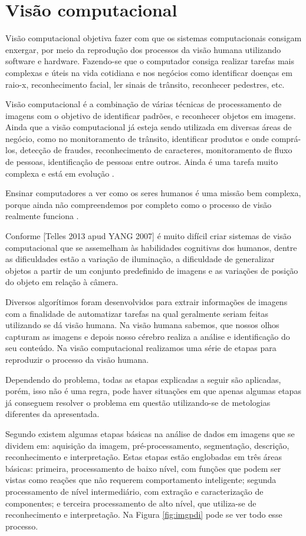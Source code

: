 \section{Visão computacional}
\label{sec:vc}
Visão computacional objetiva fazer com que os sistemas computacionais consigam enxergar, por meio da reprodução dos processos da visão humana utilizando software e hardware. Fazendo-se que o computador consiga realizar tarefas mais complexas e úteis na vida cotidiana e nos negócios como identificar doenças em raio-x, reconhecimento facial, ler sinais de trânsito, reconhecer pedestres, etc. \cite{dsAcademy2017}

Visão computacional é a combinação de várias técnicas de processamento de imagens  com o objetivo de identificar padrões, e reconhecer objetos em imagens. Ainda que a visão computacional já esteja sendo utilizada em diversas áreas de negócio, como no monitoramento de trânsito, identificar produtos e onde comprá-los, detecção de fraudes, reconhecimento de caracteres, monitoramento de fluxo de pessoas, identificação de pessoas entre outros. Ainda é uma tarefa muito complexa e está em evolução \cite{dsAcademy2017}.


Ensinar computadores a ver como os seres humanos é uma missão bem complexa, porque ainda não compreendemos por completo como o processo de visão realmente funciona \cite{dsAcademy2017}.

Conforme [Telles 2013 apud YANG 2007] é muito difícil criar sistemas de visão computacional que se assemelham  às  habilidades cognitivas dos  humanos, dentre as dificuldades estão a variação de iluminação, a dificuldade de generalizar objetos a partir de um conjunto predefinido de imagens e as variações de posição do objeto em relação à câmera.

Diversos algorítimos foram desenvolvidos para extrair informações de imagens com a finalidade de automatizar tarefas na qual geralmente seriam feitas utilizando se dá visão humana. Na visão humana  sabemos,  que  nossos olhos capturam as imagens e depois nosso cérebro realiza a análise e identificação do seu conteúdo. Na visão computacional realizamos uma série de etapas para reproduzir o processo da visão humana.

Dependendo do problema, todas as etapas explicadas a seguir são aplicadas, porém, isso não é uma regra, pode haver situações em que apenas algumas etapas já conseguem resolver o problema em questão utilizando-se de metologias diferentes  da apresentada.

Segundo \cite{digitalImgProcess2010} existem algumas etapas básicas na análise de dados em imagens que se dividem em: aquisição da imagem, pré-processamento, segmentação, descrição, reconhecimento e interpretação. Estas etapas estão englobadas em três áreas básicas: primeira, processamento de baixo nível, com funções que podem ser vistas como reações que não requerem comportamento inteligente; segunda processamento de nível intermediário, com extração e caracterização de componentes; e terceira processamento de alto nível, que utiliza-se de reconhecimento e interpretação. Na Figura \ref{fig:imgpdi} pode se ver todo esse processo.

